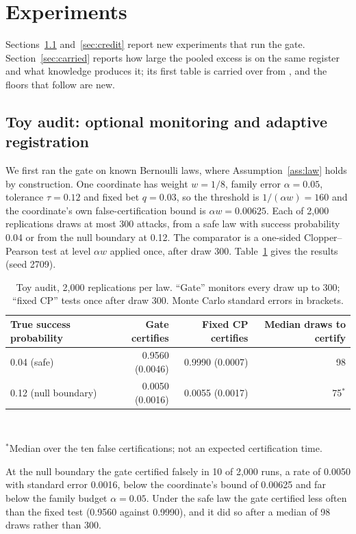\section{Experiments}\label{sec:experiments}
Sections~\ref{sec:new-sim} and~\ref{sec:credit} report new experiments that run the gate. Section~\ref{sec:carried} reports how large the pooled excess is on the same register and what knowledge produces it; its first table is carried over from \cite{mahomane2026}, and the floors that follow are new.

\subsection{Toy audit: optional monitoring and adaptive registration}\label{sec:new-sim}
We first ran the gate on known Bernoulli laws, where Assumption~\ref{ass:law} holds by construction. One coordinate has weight $w=1/8$, family error $\alpha=0.05$, tolerance $\tau=0.12$ and fixed bet $q=0.03$, so the threshold is $1/(\alpha w)=160$ and the coordinate's own false-certification bound is $\alpha w=0.00625$. Each of 2,000 replications draws at most 300 attacks, from a safe law with success probability 0.04 or from the null boundary at 0.12. The comparator is a one-sided Clopper--Pearson test at level $\alpha w$ applied once, after draw 300. Table~\ref{tab:new-audit} gives the results (seed 2709).

\begin{table}[t]\centering\small
\caption{Toy audit, 2,000 replications per law. ``Gate'' monitors every draw up to 300; ``fixed CP'' tests once after draw 300. Monte Carlo standard errors in brackets.}\label{tab:new-audit}
\begin{tabular}{lrrr}
\toprule
True success probability & Gate certifies & Fixed CP certifies & Median draws to certify\\\midrule
0.04 (safe) & 0.9560 (0.0046) & 0.9990 (0.0007) & 98\\
0.12 (null boundary) & 0.0050 (0.0016) & 0.0055 (0.0017) & 75$^\ast$\\\bottomrule
\end{tabular}\\[2pt]
\parbox{.92\linewidth}{\footnotesize $^\ast$Median over the ten false certifications; not an expected certification time.}
\end{table}

At the null boundary the gate certified falsely in 10 of 2,000 runs, a rate of 0.0050 with standard error 0.0016, below the coordinate's bound of 0.00625 and far below the family budget $\alpha=0.05$. Under the safe law the gate certified less often than the fixed test (0.9560 against 0.9990), and it did so after a median of 98 draws rather than 300.

